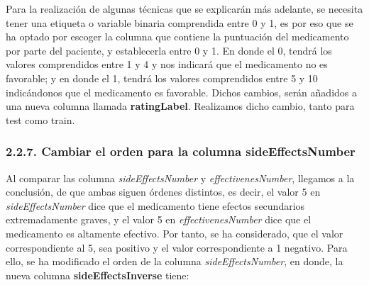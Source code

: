 \documentclass[spanish,]{article}
\newenvironment{Shaded}{\begin{snugshade}}{\end{snugshade}}
\newcommand{\KeywordTok}[1]{\textcolor[rgb]{0.13,0.29,0.53}{\textbf{#1}}}
\newcommand{\DecValTok}[1]{\textcolor[rgb]{0.00,0.00,0.81}{#1}}
\newcommand{\StringTok}[1]{\textcolor[rgb]{0.31,0.60,0.02}{#1}}
\newcommand{\CommentTok}[1]{\textcolor[rgb]{0.56,0.35,0.01}{\textit{#1}}}
\newcommand{\ControlFlowTok}[1]{\textcolor[rgb]{0.13,0.29,0.53}{\textbf{#1}}}
\newcommand{\OperatorTok}[1]{\textcolor[rgb]{0.81,0.36,0.00}{\textbf{#1}}}
\newcommand{\NormalTok}[1]{#1}
\begin{document}
Para la realización de algunas técnicas que se explicarán más adelante,
se necesita tener una etiqueta o variable binaria comprendida entre 0 y
1, es por eso que se ha optado por escoger la columna que contiene la
puntuación del medicamento por parte del paciente, y establecerla entre
0 y 1. En donde el 0, tendrá los valores comprendidos entre 1 y 4 y nos
indicará que el medicamento no es favorable; y en donde el 1, tendrá los
valores comprendidos entre 5 y 10 indicándonos que el medicamento es
favorable. Dichos cambios, serán añadidos a una nueva columna llamada
\textbf{ratingLabel}. Realizamos dicho cambio, tanto para test como
train.

\begin{Shaded}
\end{Shaded}

\subsubsection{2.2.7. Cambiar el orden para la columna
sideEffectsNumber}\label{cambiar-el-orden-para-la-columna-sideeffectsnumber}

Al comparar las columna \emph{sideEffectsNumber} y
\emph{effectivenesNumber}, llegamos a la conclusión, de que ambas siguen
órdenes distintos, es decir, el valor 5 en \emph{sideEffectsNumber} dice
que el medicamento tiene efectos secundarios extremadamente graves, y el
valor 5 en \emph{effectivenesNumber} dice que el medicamento es
altamente efectivo. Por tanto, se ha considerado, que el valor
correspondiente al 5, sea positivo y el valor correspondiente a 1
negativo. Para ello, se ha modificado el orden de la columna
\emph{sideEffectsNumber}, en donde, la nueva columna
\textbf{sideEffectsInverse} tiene:
\end{document}
